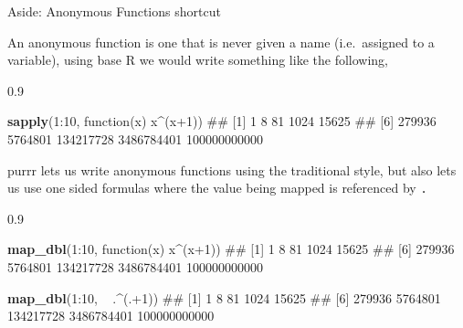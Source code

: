 \documentclass[11pt,ignorenonframetext,]{beamer}
\newenvironment{Shaded}{}{}
\newcommand{\KeywordTok}[1]{\textcolor[rgb]{0.00,0.44,0.13}{\textbf{{#1}}}}
\newcommand{\DecValTok}[1]{\textcolor[rgb]{0.25,0.63,0.44}{{#1}}}
\newcommand{\StringTok}[1]{\textcolor[rgb]{0.25,0.44,0.63}{{#1}}}
\newcommand{\NormalTok}[1]{{#1}}
\let\oldShaded\Shaded
\let\endoldShaded\endShaded
\renewenvironment{Shaded}{\footnotesize\begin{spacing}{0.9}\oldShaded}{\endoldShaded\end{spacing}}
\begin{document}
\begin{frame}[fragile]{Aside: Anonymous Functions shortcut}

An anonymous function is one that is never given a name (i.e.~assigned
to a variable), using base R we would write something like the
following,

\begin{Shaded}
\begin{Highlighting}[]
\KeywordTok{sapply}\NormalTok{(}\DecValTok{1}\NormalTok{:}\DecValTok{10}\NormalTok{, function(x) x^(x}\DecValTok{+1}\NormalTok{))}
\NormalTok{##  [1]            1            8           81         1024        15625}
\NormalTok{##  [6]       279936      5764801    134217728   3486784401 100000000000}
\end{Highlighting}
\end{Shaded}

purrr lets us write anonymous functions using the traditional style, but
also lets us use one sided formulas where the value being mapped is
referenced by \texttt{.}

\begin{Shaded}
\begin{Highlighting}[]
\KeywordTok{map_dbl}\NormalTok{(}\DecValTok{1}\NormalTok{:}\DecValTok{10}\NormalTok{, function(x) x^(x}\DecValTok{+1}\NormalTok{))}
\NormalTok{##  [1]            1            8           81         1024        15625}
\NormalTok{##  [6]       279936      5764801    134217728   3486784401 100000000000}

\KeywordTok{map_dbl}\NormalTok{(}\DecValTok{1}\NormalTok{:}\DecValTok{10}\NormalTok{, ~}\StringTok{ }\NormalTok{.^(.+}\DecValTok{1}\NormalTok{))}
\NormalTok{##  [1]            1            8           81         1024        15625}
\NormalTok{##  [6]       279936      5764801    134217728   3486784401 100000000000}
\end{Highlighting}
\end{Shaded}

\end{frame}
\end{document}
